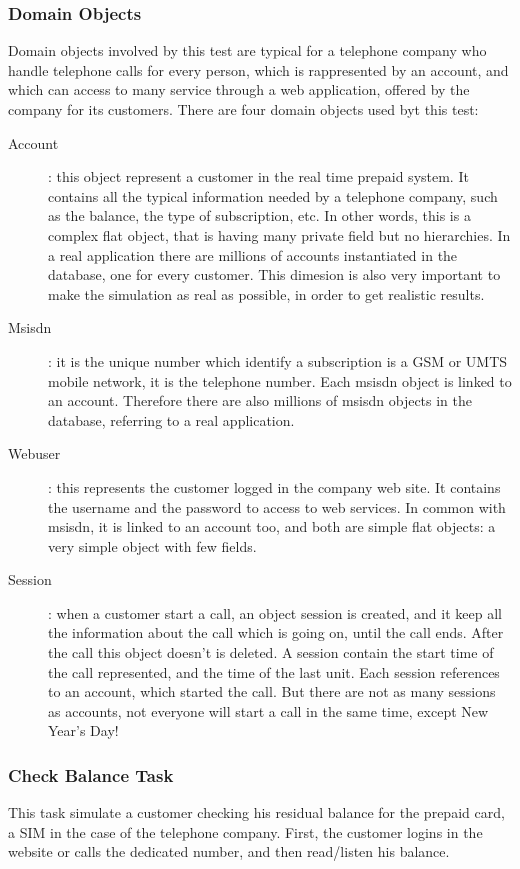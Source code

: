 			\subsubsection{Domain Objects}
Domain objects involved by this test are typical for a telephone company who handle telephone calls for every person, which is rappresented by an account, and which can access to many service through a web application, offered by the company for its customers. There are four domain objects used byt this test:
\begin{description}
	\item[Account]: this object represent a customer in the real time prepaid system. It contains all the typical information needed by a telephone company, such as the balance, the type of subscription, etc. In other words, this is a complex flat object, that is having many private field but no hierarchies. In a real application there are millions of accounts instantiated in the database, one for every customer. This dimesion is also very important to make the simulation as real as possible, in order to get realistic results.
	\item[Msisdn]: it is the unique number which identify a subscription is a GSM or UMTS mobile network, it is the telephone number. Each msisdn object is linked to an account. Therefore there are also millions of msisdn objects in the database, referring to a real application.
	\item[Webuser]: this represents the customer logged in the company web site. It contains the username and the password to access to web services. In common with msisdn, it is linked to an account too, and both are simple flat objects: a very simple object with few fields.
	\item[Session]: when a customer start a call, an object session is created, and it keep all the information about the call which is going on, until the call ends. After the call this object doesn't is deleted. A session contain the start time of the call represented, and the time of the last unit. Each session references to an account, which started the call. But there are not as many sessions as accounts, not everyone will start a call in the same time, except New Year's Day!
\end{description}

			\subsubsection{Check Balance Task}
This task simulate a customer checking his residual balance for the prepaid card, a SIM in the case of the telephone company. First, the customer logins in the website or calls the dedicated number, and then read/listen his balance.

